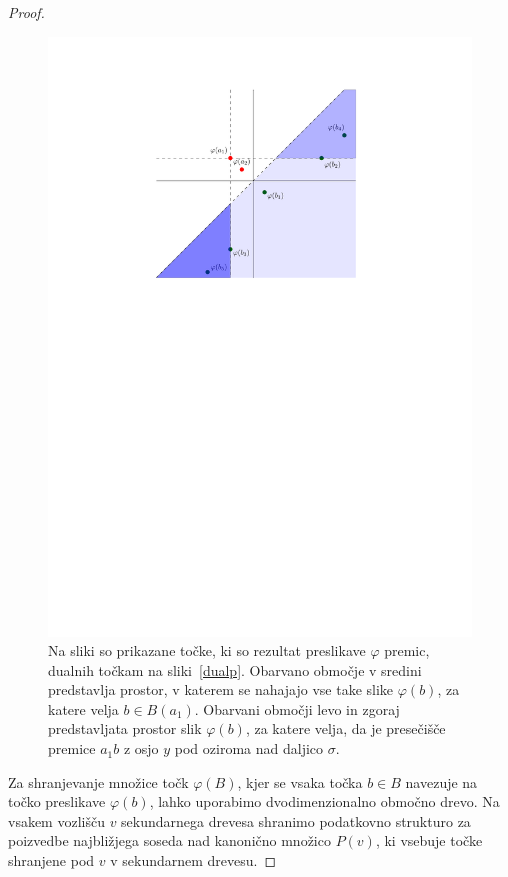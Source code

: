 \documentclass[a4paper, 12pt]{book}
\begin{document}
\begin{proof}
\begin{figure}[htp]
\centerline{\includegraphics[scale=1]{pics/dual_problem4.pdf}}
\caption{Na sliki so prikazane točke, ki so rezultat preslikave $\varphi$ premic, dualnih točkam na sliki~\ref{dualp}. Obarvano območje v sredini predstavlja prostor, v katerem se nahajajo vse take slike $\varphi (b)$, za katere velja $b \in B(a_1)$. Obarvani območji levo in zgoraj predstavljata prostor slik $\varphi (b)$, za katere velja, da je presečišče premice $a_1b$ z osjo $y$ pod oziroma nad daljico $\sigma$.} 
\label{dualp2}
\end{figure}

Za shranjevanje množice točk $\varphi(B)$, kjer se vsaka točka $b \in B$ navezuje na točko preslikave $\varphi(b)$, lahko uporabimo dvodimenzionalno območno drevo. Na vsakem vozlišču $v$ sekundarnega drevesa shranimo podatkovno strukturo za poizvedbe najbližjega soseda nad kanonično množico $P(v)$, ki vsebuje točke shranjene pod $v$ v sekundarnem drevesu. 


\end{proof}
\end{document}
